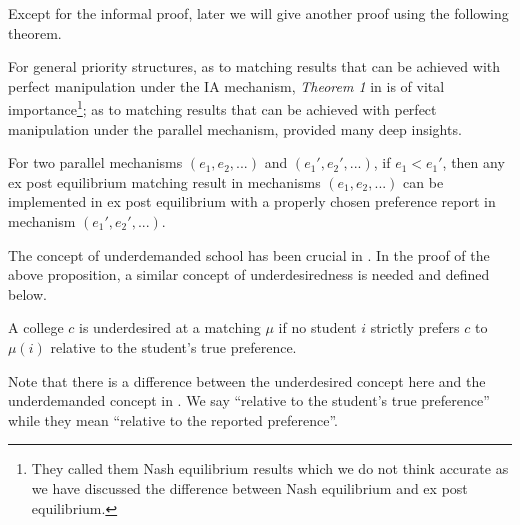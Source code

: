 Except for the informal proof, later we will give another proof using the following theorem.
 

For general priority structures, as to matching results that can be
achieved with perfect manipulation under the IA mechanism, \emph{Theorem 1} in \parencite{Ergin2006} is of vital importance\footnote{They called them Nash equilibrium results which we do not think accurate as we have discussed the difference between Nash equilibrium and ex post equilibrium.}; as to matching
results that can be achieved with perfect manipulation under the
parallel mechanism,  \parencite{YanChenJPE} provided many deep insights.

\begin{thm}
  \label{expost-equilibrium}
  For two parallel mechanisms $(e_1,e_2,...)$ and $(e_1',e_2',...)$, if $e_1 < e_1'$, then any ex post equilibrium matching result in mechanisms $(e_1,e_2,...)$ can be implemented in ex post equilibrium with a properly chosen preference report in mechanism $(e_1',e_2',...)$.
\end{thm}

The concept of underdemanded school has been crucial in \parencite{Qianfeng2014}.
In the proof of the above proposition, a similar concept of underdesiredness is needed and defined below.
\begin{definition}
  A college $c$ is underdesired at a matching $\mu$ if no student $i$ strictly prefers $c$ to $\mu(i)$ relative to the student's true preference.
\end{definition}

Note that there is a difference between the underdesired concept here and the underdemanded concept in  \parencite{Qianfeng2014}. We say ``relative to the student's true preference'' while they mean ``relative to the reported preference''.

